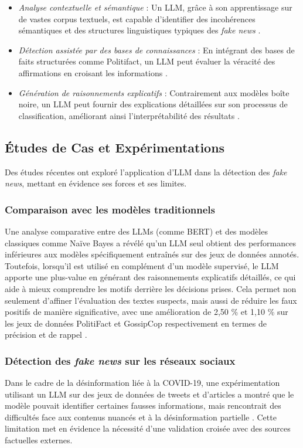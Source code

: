 \documentclass[a4paper,12pt, twocolumn]{article}
\begin{document}
\begin{twocolumn}
\begin{itemize}
\item \textit{Analyse contextuelle et sémantique} : 
Un LLM, grâce à son apprentissage sur de vastes corpus textuels, est capable d’identifier des incohérences sémantiques et des structures linguistiques typiques des \textit{fake news} \cite{truica_its_2023}.
\item \textit{Détection assistée par des bases de connaissances} : En intégrant des bases de faits structurées comme Politifact, un LLM peut évaluer la véracité des affirmations en croisant les informations \cite{alghamdi_towards_2023}.
\item \textit{Génération de raisonnements explicatifs} : Contrairement aux modèles boîte noire, un LLM peut fournir des explications détaillées sur son processus de classification, améliorant ainsi l’interprétabilité des résultats \cite{hu_bad_2024}.
\end{itemize}

\subsection{Études de Cas et Expérimentations}
Des études récentes ont exploré l’application d'LLM dans la détection des \textit{fake news}, mettant en évidence ses forces et ses limites.

\subsubsection{Comparaison avec les modèles traditionnels}
Une analyse comparative entre des LLMs (comme BERT) et des modèles classiques comme Naïve Bayes a révélé qu'un LLM seul obtient des performances inférieures aux modèles spécifiquement entraînés sur des jeux de données annotés. Toutefois, lorsqu'il est utilisé en complément d'un modèle supervisé, le LLM apporte une plus-value en générant des raisonnements explicatifs détaillés, ce qui aide à mieux comprendre les motifs derrière les décisions prises. Cela permet non seulement d'affiner l'évaluation des textes suspects, mais aussi de réduire les faux positifs de manière significative, avec une amélioration de 2,50 \% et 1,10 \% sur les jeux de données PolitiFact et GossipCop respectivement en termes de précision et de rappel \cite{rai_fake_2022}.

\subsubsection{Détection des \textit{fake news} sur les réseaux sociaux}
Dans le cadre de la désinformation liée à la COVID-19, une expérimentation utilisant un LLM sur des jeux de données de tweets et d’articles a montré que le modèle pouvait identifier certaines fausses informations, mais rencontrait des difficultés face aux contenus nuancés et à la désinformation partielle \cite{alghamdi_towards_2023}. Cette limitation met en évidence la nécessité d’une validation croisée avec des sources factuelles externes.


\end{twocolumn}
\end{document}
